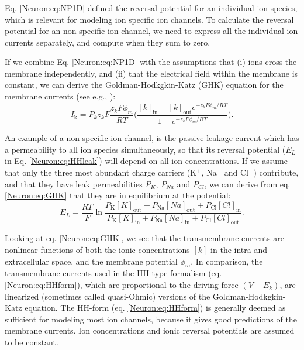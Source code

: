 \subsubsection{}
\label{sec:Neuron:GHK}
Eq. \ref{Neuron:eq:NP1D} defined the reversal potential for an individual ion species, which is relevant for modeling ion specific ion channels. To calculate the reversal potential for an non-specific ion channel, we need to express all the individual ion currents separately, and compute when they sum to zero. 

If we combine Eq. \ref{Neuron:eq:NP1D} with the assumptions that (i) ions cross the membrane independently, and (ii) that the electrical field within the membrane is constant, we can derive the Goldman-Hodkgkin-Katz (GHK) equation for the membrane currents (see e.g., \cite{hodgkin1949, johnston1994foundations}):
\begin{equation}
I_\text{k} = P_k z_k F \frac{z_k F \phi_m}{R T} \Big( \frac{[k]_\text{in}-[k]_\text{out} e^{-z_k F \phi_m/RT}} {1-e^{-z_k F \phi_m/RT}} \Big).
\label{Neuron:eq:GHK}
\end{equation}

An example of a non-specific ion channel, is the passive leakage current which has a permeability to all ion species simultaneously, so that its reversal potential ($E_L$ in Eq. \ref{Neuron:eq:HHleak}) will depend on all ion concentrations. If we assume that only the three most abundant charge carriers (K$^{+}$, Na$^{+}$ and Cl$^{-}$) contribute, and that they have leak permeabilities $P_K$, $P_{Na}$ and $P_{Cl}$, we can derive from eq. \ref{Neuron:eq:GHK} that they are in equilibrium at the potential:
\begin{equation}
E_L = \frac{R T}{F} 
\ln \frac{P_\text{K} [K]_\text{out}+P_\text{Na} [Na]_\text{out} + P_\text{Cl} [Cl]_\text{in}}
           {P_\text{K} [K]_\text{in}+P_\text{Na} [Na]_\text{in} + P_\text{Cl} [Cl]_\text{out}}.
\label{Neuron:eq:Eleak_GHK}
\end{equation}

Looking at eq. \ref{Neuron:eq:GHK}, we see that the transmembrane currents are nonlinear functions of both the ionic concentrations $[k]$ in the intra and extracellular space, and the membrane potential $\phi_m$. In comparison, the transmembrane currents used in the HH-type formalism (eq. \ref{Neuron:eq:HHform}), which are proportional to the driving force $(V-E_k)$, are linearized (sometimes called quasi-Ohmic) versions of the Goldman-Hodkgkin-Katz equation. The HH-form (eq. \ref{Neuron:eq:HHform}) is generally deemed as sufficient for modeling most ion channels, because it gives good predictions of the membrane currents. Ion concentrations and ionic reversal potentials are assumed to be constant.


